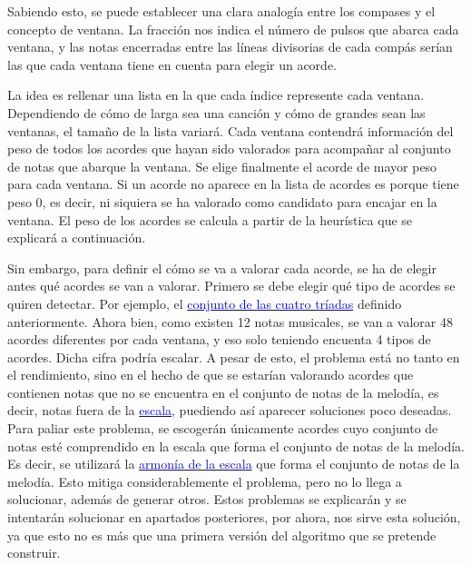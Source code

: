     Sabiendo esto, se puede establecer una clara analogía entre los compases y el concepto de ventana. La fracción nos indica el número de pulsos que abarca cada ventana, y las notas encerradas entre las líneas divisorias de cada compás serían las que cada ventana tiene en cuenta para elegir un acorde. 

    La idea es rellenar una lista en la que cada índice represente cada ventana. Dependiendo de cómo de larga sea una canción y cómo de grandes sean las ventanas, el tamaño de la lista variará. Cada ventana contendrá información del peso de todos los acordes que hayan sido valorados para acompañar al conjunto de notas que abarque la ventana. Se elige finalmente el acorde de mayor peso para cada ventana. Si un acorde no aparece en la lista de acordes es porque tiene peso 0, es decir, ni siquiera se ha valorado como candidato para encajar en la ventana. El peso de los acordes se calcula a partir de la heurística que se explicará a continuación.

    Sin embargo, para definir el cómo se va a valorar cada acorde, se ha de elegir antes qué acordes se van a valorar. Primero se debe elegir qué tipo de acordes se quiren detectar. Por ejemplo, el \hyperref[tab:triads]{\textcolor{blue}{conjunto de las cuatro tríadas}} definido anteriormente. Ahora bien, como existen 12 notas musicales, se van a valorar 48 acordes diferentes por cada ventana, y eso solo teniendo encuenta 4 tipos de acordes. Dicha cifra podría escalar. A pesar de esto, el problema está no tanto en el rendimiento, sino en el hecho de que se estarían valorando acordes que contienen notas que no se encuentra en el conjunto de notas de la melodía, es decir, notas fuera de la \hyperref[sec:arm:escalas]{\textcolor{blue}{escala}}, puediendo así aparecer soluciones poco deseadas. Para paliar este problema, se escogerán únicamente acordes cuyo conjunto de notas esté comprendido en la escala que forma el conjunto de notas de la melodía. Es decir, se utilizará la \hyperref[arm:armonia_escala]{\textcolor{blue}{armonía de la escala}} que forma el conjunto de notas de la melodía. Esto mitiga considerablemente el problema, pero no lo llega a solucionar, además de generar otros. Estos problemas se explicarán y se intentarán solucionar en apartados posteriores, por ahora, nos sirve esta solución, ya que esto no es más que una primera versión del algoritmo que se pretende construir.

